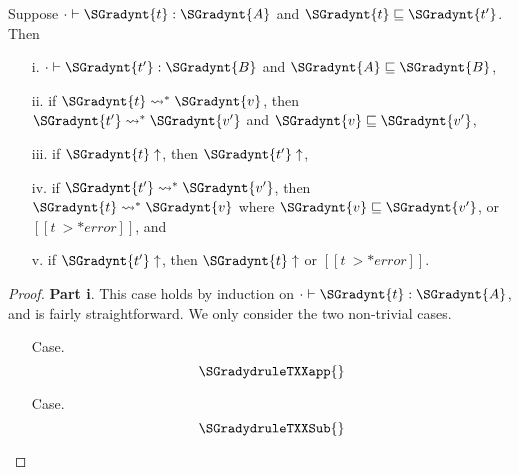 \begin{theorem}
  \label{thm:gradual_guarantee}
  Suppose $  \cdot   \vdash  \SGradynt{t}  :  \SGradynt{A} $ and $ \SGradynt{t}  \sqsubseteq  \SGradynt{t'} $.  Then
  \begin{itemize}
  \item[i.] $  \cdot   \vdash  \SGradynt{t'}  :  \SGradynt{B} $ and $ \SGradynt{A}  \sqsubseteq  \SGradynt{B} $,
  \item[ii.] if $ \SGradynt{t}  \rightsquigarrow^*  \SGradynt{v} $, then $ \SGradynt{t'}  \rightsquigarrow^*  \SGradynt{v'} $ and $ \SGradynt{v}  \sqsubseteq  \SGradynt{v'} $,
  \item[iii.] if $ \SGradynt{t}  \uparrow $, then $ \SGradynt{t'}  \uparrow $,
  \item[iv.] if $ \SGradynt{t'}  \rightsquigarrow^*  \SGradynt{v'} $, then $ \SGradynt{t}  \rightsquigarrow^*  \SGradynt{v} $ where $ \SGradynt{v}  \sqsubseteq  \SGradynt{v'} $, or $[[t ~>* error]]$, and
  \item [v.] if $ \SGradynt{t'}  \uparrow $, then $ \SGradynt{t}  \uparrow $ or $[[t ~>* error]]$.
  \end{itemize}
\end{theorem}
\begin{proof}
  \textbf{Part i}. This case holds by induction on $  \cdot   \vdash  \SGradynt{t}  :  \SGradynt{A} $,
  and is fairly straightforward.  We only consider the two non-trivial
  cases.
  \begin{itemize}
  \item[] Case.
    \[
    \SGradydruleTXXapp{}
    \]
    
  \item[] Case.
    \[
    \SGradydruleTXXSub{}
    \]
    
  \end{itemize}

\end{proof}
